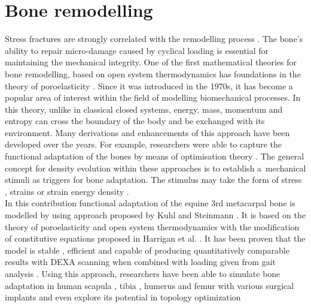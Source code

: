 \documentclass[11pt]{acmeArticle}
\numberwithin{equation}{section}
\begin{document}
\section{Bone remodelling} 
\label{sec:bone_remodel}
Stress fractures are strongly correlated with the remodelling process \citep{hughes2017role}. 
The bone's ability to repair micro-damage caused by cyclical loading is essential for maintaining the mechanical integrity. 
One of the first mathematical theories for bone remodelling, based on open system thermodynamics has foundations in the 
theory of poroelasticity \citep{cowin1976bone}. 
Since it was introduced in the 1970s, it has become a popular area of interest within the field of modelling biomechanical processes. 
In this theory, unlike in classical closed systems, energy, mass, momentum and entropy can cross the boundary of the body and 
be exchanged with its environment. 
Many derivations and enhancements of this approach have been developed over the years. 
For example, researchers were able to capture the functional adaptation of the bones by means of optimisation theory
 \citep{harrigan1996bone, jacobs1995numerical, weinans1992behavior}.
The general concept for density evolution within these approaches is to establish a~mechanical stimuli as triggers for bone adaptation. 
The stimulus may take the form of stress \citep{beaupre1990approach, carter1996mechanical, doblare2002anisotropic}, strains \citep{cowin1976bone} or strain energy density \citep{weinans1992behavior, kuhl2003theory,kaczmarczyk2011efficient, Connor2017bone}. 
\\ 
In this contribution functional adaptation of the equine 3rd metacarpal bone is modelled by using approach proposed by Kuhl and Steinmann \citep{kuhl2003theory}. 
It is based on the theory of poroelasticity and open system thermodynamics with the modification of constitutive equations proposed in Harrigan et al. 
\citep{harrigan1996bone}. 
It has been proven that the model is stable \citep{kuhl2003computational}, efficient \citep{kaczmarczyk2011efficient} and capable of 
producing quantitatively comparable results with DEXA scanning when combined with loading given from gait analysis \citep{pang2012computational}. 
Using this approach, researchers have been able to simulate bone adaptation in human scapula \citep{liedtke2017computational}, 
tibia \citep{pang2012computational}, humerus \citep{taylor2009phenomenon} and femur with various surgical implants 
\citep{ambrosi2011perspectives, Connor2017bone} and even explore its potential in topology optimization 
\end{document}
